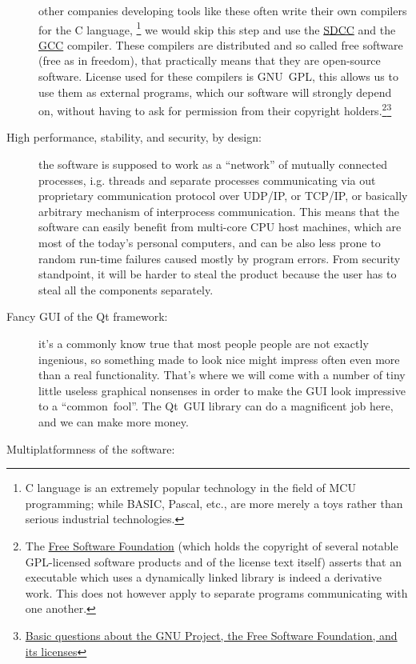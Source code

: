 \documentclass[a4paper,twoside,15pt]{book}
\begin{document}
\begin{description}
					other companies developing tools like these often write their own compilers for the C language, \footnote{C language is an extremely popular technology in the field of MCU programming; while BASIC, Pascal, etc., are more merely a toys rather than serious industrial technologies.} we would skip this step and use the \href{http://en.wikipedia.org/wiki/Small_Device_C_Compiler}{SDCC} and the \href{http://en.wikipedia.org/wiki/GNU_Compiler_Collection}{GCC} compiler. These compilers are distributed and so called free software (free as in freedom), that practically means that they are open-source software. License used for these compilers is GNU~GPL, this allows us to use them as external programs, which our software will strongly depend on, without having to ask for permission from their copyright holders.\footnote{The \href{http://en.wikipedia.org/wiki/Free_Software_Foundation}{Free Software Foundation} (which holds the copyright of several notable GPL-licensed software products and of the license text itself) asserts that an executable which uses a dynamically linked library is indeed a derivative work. This does not however apply to separate programs communicating with one another.}\footnote{\href{http://www.gnu.org/licenses/gpl-faq.html\#NFUseGPLPlugins}{Basic questions about the GNU Project, the Free Software Foundation, and its licenses}}
				\item[High performance, stability, and security, by design:]
					the software is supposed to work as a ``network'' of mutually connected processes, i.g. threads and separate processes communicating via out proprietary communication protocol over UDP/IP, or TCP/IP, or basically arbitrary mechanism of interprocess communication. This means that the software can easily benefit from multi-core CPU host machines, which are most of the today's personal computers, and can be also less prone to random run-time failures caused mostly by program errors. From security standpoint, it will be harder to steal the product because the user has to steal all the components separately.
				\item[Fancy GUI of the Qt framework:]
					it's a commonly know true that most people people are not exactly ingenious, so something made to look nice might impress often even more than a real functionality. That's where we will come with a number of tiny little useless graphical nonsenses in order to make the GUI look impressive to a ``common~fool''. The Qt~GUI library can do a magnificent job here, and we can make more money.
				\item[Multiplatformness of the software:]

\end{description}
\end{document}
